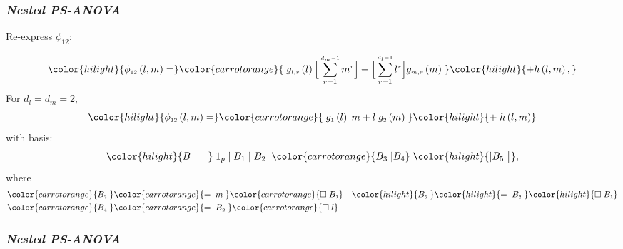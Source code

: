 \documentclass[12pt]{beamer}
\newcommand{\ms}{\scriptscriptstyle}
\newcommand{\newmaththought}[1]{{ \color{hilight} {#1}}}
\newcommand{\carrotorangemath}[1]{{ \color{carrotorange} {#1}}}
\begin{document}
\begin{frame}
\frametitle{\emph{Nested PS-ANOVA}}

Re-express $\phi_{\ms{12}}$:

\begin{align*}
\newmaththought{ \phi_{\ms{12}}\left(l,m\right)  =} \carrotorangemath{\; g_{\ms{l,r}}\left(l\right) \Big[ \sum_{r=1}^{\ms{d_m-1}} m^{\ms r}\Big] + \Big[ \sum_{r=1}^{\ms{d_l-1}} l^{\ms r} \Big] g_{\ms{m,r}}\left(m\right)\;}  \newmaththought{+ h\left( l,m \right), } 
\end{align*}
\noindent
For $d_l = d_m = 2$,
\[
\newmaththought{ \phi_{\ms{12}}\left(l,m\right)  =} \carrotorangemath{\; g_{\ms 1}\left(l\right) \; m+ l \; g_{\ms 2}\left(m\right)\;}\newmaththought{ + \; h\left( l,m \right) } 
\]
with basis:
\begin{equation} \label{eq:nested-SANOVA-basis-matrix}
\color{hilight}{B = \big[ } \; 1_p \; \vert \;  B_1  \; \vert \;   B_2 \; \vert \carrotorangemath{ B_3 \; \vert B_4 }\;\newmaththought{ \vert B_5 \; \big]},
\end{equation}
\noindent
where
\begin{align*}
\carrotorangemath{B_{\ms 3}\;} &\carrotorangemath{= \;m \;} \carrotorangemath{ \square \;  B_{\ms 1}}  &  \newmaththought{B_{\ms 5}\;}\newmaththought{=\; B_{\ms 2} \;} \newmaththought{ \square \; B_{\ms 1} } \\
 \carrotorangemath{B_{\ms 4}\;}&\carrotorangemath{=\; B_{\ms 2} \;} \carrotorangemath{ \square \; l } &
\end{align*}


\end{frame}




\begin{frame}
\frametitle{\emph{Nested PS-ANOVA}}



\end{frame}
\end{document}
